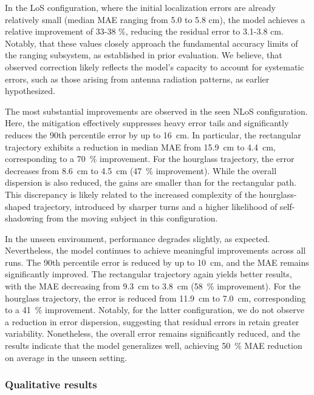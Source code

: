 In the LoS configuration, where the initial localization errors are already relatively small (median MAE ranging from 5.0 to 5.8 \si{\centi\meter}), the model achieves a relative improvement of 33-38 \si{\percent}, reducing the residual error to 3.1-3.8 \si{\centi\meter}. Notably, that these values closely approach the fundamental accuracy limits of the ranging subsystem, as established in prior evaluation. We believe, that observed correction likely reflects the model’s capacity to account for systematic errors, such as those arising from antenna radiation patterns, as earlier hypothesized.

The most substantial improvements are observed in the seen NLoS configuration. Here, the mitigation effectively suppresses heavy error tails and significantly reduces the 90th percentile error by up to \SI{16}{\centi\metre}. In particular, the rectangular trajectory exhibits a reduction in median MAE from \SI{15.9}{\centi\metre} to \SI{4.4}{\centi\metre}, corresponding to a \SI{70}{\percent} improvement. For the hourglass trajectory, the error decreases from \SI{8.6}{\centi\metre} to \SI{4.5}{\centi\metre} (\SI{47}{\percent} improvement). While the overall dispersion is also reduced, the gains are smaller than for the rectangular path. This discrepancy is likely related to the increased complexity of the hourglass-shaped trajectory, introduced by sharper turns and a higher likelihood of self-shadowing from the moving subject in this configuration.

In the unseen environment, performance degrades slightly, as expected. Nevertheless, the model continues to achieve meaningful improvements across all runs. The 90th percentile error is reduced by up to \SI{10}{\centi\metre}, and the MAE remains significantly improved. The rectangular trajectory again yields better results, with the MAE decreasing from \SI{9.3}{\centi\metre} to \SI{3.8}{\centi\metre} (\SI{58}{\percent} improvement). For the hourglass trajectory, the error is reduced from \SI{11.9}{\centi\metre} to \SI{7.0}{\centi\metre}, corresponding to a \SI{41}{\percent} improvement. Notably, for the latter configuration, we do not observe a reduction in error dispersion, suggesting that residual errors in retain greater variability. Nonetheless, the overall error remains significantly reduced, and the results indicate that the model generalizes well, achieving \SI{50}{\percent} MAE reduction on average in the unseen setting.

\subsubsection{Qualitative results}

